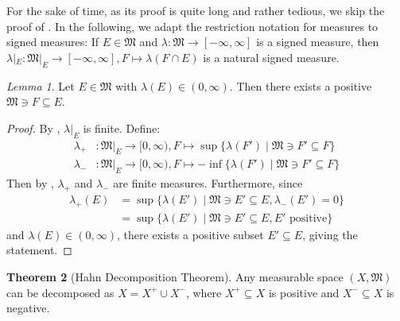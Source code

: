 \documentclass[10pt, leqno]{amsart}
\theoremstyle{definition}
\newtheorem{theorem}{Theorem}[section]
\theoremstyle{remark}
\newtheorem{lemma}[theorem]{Lemma}
\begin{document}
    For the sake of time, as its proof is quite long and rather tedious, we skip the proof of . In the following, we adapt the restriction notation for measures to signed measures: If \(E \in \mathfrak{M}\) and \(\lambda\colon \mathfrak{M} \to [-\infty, \infty]\) is a signed measure, then \(\lambda|_E\colon \mathfrak{M}|_E \to [-\infty, \infty], F \mapsto \lambda(F \cap E)\) is a natural signed measure.

    \begin{lemma} \label{lem:existence_of_positive_subset}
        Let \(E \in \mathfrak{M}\) with \(\lambda(E) \in (0, \infty)\). Then there exists a positive \(\mathfrak{M} \ni F \subseteq E\).
    \end{lemma}

    \begin{proof}
        By , \(\lambda|_E\) is finite. Define:
        \begin{align}
            \lambda_+&\colon \mathfrak{M}|_E \to [0, \infty), F \mapsto \sup\{\lambda(F') \mid \mathfrak{M} \ni F' \subseteq F\}\\
            \lambda_-&\colon \mathfrak{M}|_E \to [0, \infty), F \mapsto -\inf\{\lambda(F') \mid \mathfrak{M} \ni F' \subseteq F\}
        \end{align}
        Then by , \(\lambda_+\) and \(\lambda_-\) are finite measures. Furthermore, since
        \begin{align}
            \lambda_+(E) &= \sup\{\lambda(E') \mid \mathfrak{M} \ni E' \subseteq E, \lambda_-(E') = 0\}\\
            &= \sup\{\lambda(E') \mid \mathfrak{M} \ni E' \subseteq E, E' \text{ positive}\}
        \end{align}
        and \(\lambda(E) \in (0, \infty)\), there exists a positive subset \(E' \subseteq E\), giving the statement.
    \end{proof}


    \begin{theorem}[Hahn Decomposition Theorem] \label{thm:hahn_decomposition}
        Any measurable space \((X, \mathfrak{M})\) can be decomposed as \(X = X^+ \cup X^-\), where \(X^+ \subseteq X\) is positive and \(X^- \subseteq X\) is negative.
    \end{theorem}
\end{document}

